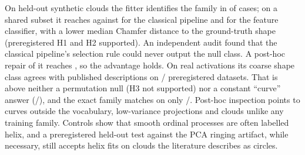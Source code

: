 On \nMethod{} held-out synthetic clouds the fitter identifies the family in \accMethod{} of cases; on a shared subset it reaches \accMethodsub{} against \accBone{} for the classical pipeline and \accBtwo{} for the feature classifier, with a lower median Chamfer distance to the ground-truth shape (preregistered H1 and H2 supported). An independent audit found that the classical pipeline's selection rule could never output the null class. A post-hoc repair of it reaches \accBonefixed{}, so the advantage holds. On real activations its coarse shape class agrees with published descriptions on \hthreeAgree{}/\hthreeN{} preregistered datasets. That is above neither a permutation null (H3 not supported) nor a constant ``curve'' answer (\hthreeConst{}/\hthreeN{}), and the exact family matches on only \hthreeFine{}/\hthreeN{}. Post-hoc inspection points to curves outside the vocabulary, low-variance projections and clouds unlike any training family. Controls show that smooth ordinal processes are often labelled helix, and a preregistered held-out test against the PCA ringing artifact, while necessary, still accepts helix fits on clouds the literature describes as circles.
